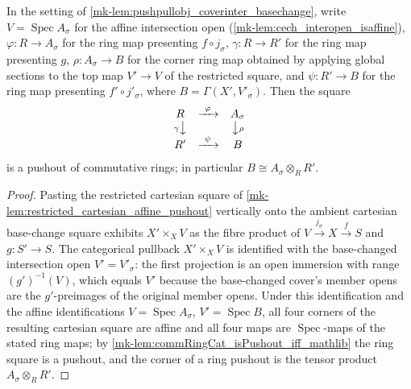 \begin{lemma}\label{mk-lem:coverinter_ring_pushout}
  \leanok

  In the setting of \ref{mk-lem:pushpullobj_coverinter_basechange}, write
  \(V = \operatorname{Spec} A_\sigma\) for the affine intersection open
  (\ref{mk-lem:cech_interopen_isaffine}), \(\varphi : R \to A_\sigma\) for the ring map
  presenting \(f \circ j_\sigma\), \(\gamma : R \to R'\) for the ring map presenting \(g\),
  \(\rho : A_\sigma \to B\) for the corner ring map obtained by applying global sections to
  the top map \(V' \to V\) of the restricted square, and \(\psi : R' \to B\) for the ring map
  presenting \(f' \circ j'_\sigma\), where \(B = \Gamma(X', V'_\sigma)\). Then the square
  \[
    \begin{array}{ccc}
      R & \xrightarrow{\ \varphi\ } & A_\sigma\\
      {\scriptstyle \gamma}\big\downarrow & & \big\downarrow{\scriptstyle \rho}\\
      R' & \xrightarrow{\ \psi\ } & B
    \end{array}
  \]
  is a pushout of commutative rings; in particular \(B \cong A_\sigma \otimes_R R'\).
\end{lemma}
\begin{proof}
  \leanok
  Pasting the restricted cartesian square of
  \ref{mk-lem:restricted_cartesian_affine_pushout} vertically onto the ambient cartesian
  base-change square exhibits \(X' \times_X V\) as the fibre product of
  \(V \xrightarrow{j_\sigma} X \xrightarrow{f} S\) and \(g : S' \to S\). The categorical
  pullback \(X' \times_X V\) is identified with the base-changed intersection open
  \(V' = V'_\sigma\): the first projection is an open immersion with range
  \((g')^{-1}(V)\), which equals \(V'\) because the base-changed cover's member opens are
  the \(g'\)-preimages of the original member opens. Under this identification and the
  affine identifications \(V = \operatorname{Spec} A_\sigma\),
  \(V' = \operatorname{Spec} B\), all four corners of the resulting cartesian square are
  affine and all four maps are \(\operatorname{Spec}\)-maps of the stated ring maps; by
  \ref{mk-lem:commRingCat_isPushout_iff_mathlib} the ring square is a pushout, and the corner
  of a ring pushout is the tensor product \(A_\sigma \otimes_R R'\).
\end{proof}

